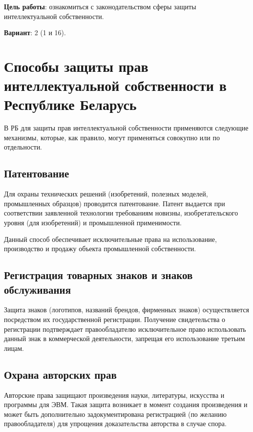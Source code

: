 \documentclass{bsuir}
\begin{document}
\maketitle
\mainmatter

\textbf{Цель работы}: ознакомиться с законодательством сферы защиты
интеллектуальной собственности.

\textbf{Вариант}: 2 (1 и 16).

\section{Способы защиты прав интеллектуальной собственности в Республике Беларусь}

В РБ для защиты прав интеллектуальной собственности применяются следующие
механизмы, которые, как правило, могут применяться совокупно или по отдельности.

\subsection*{Патентование}

Для охраны технических решений (изобретений, полезных моделей, промышленных
образцов) проводится патентование. Патент выдается при соответствии заявленной
технологии требованиям новизны, изобретательского уровня (для изобретений) и
промышленной применимости.

Данный способ обеспечивает исключительные права на использование, производство и
продажу объекта промышленной собственности.

\subsection*{Регистрация товарных знаков и знаков обслуживания}

Защита знаков (логотипов, названий брендов, фирменных знаков) осуществляется
посредством их государственной регистрации. Получение свидетельства о
регистрации подтверждает правообладателю исключительное право использовать
данный знак в коммерческой деятельности, запрещая его использование третьим
лицам.

\subsection*{Охрана авторских прав}

Авторские права защищают произведения науки, литературы, искусства и программы
для ЭВМ. Такая защита возникает в момент создания произведения и может быть
дополнительно задокументирована регистрацией (по желанию правообладателя) для
упрощения доказательства авторства в случае спора.
\end{document}
